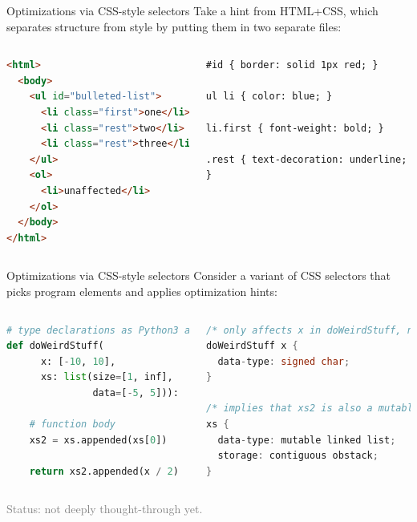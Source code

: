 \documentclass{beamer}
\begin{document}
\begin{frame}[fragile]{Optimizations via CSS-style selectors}
\vfill
Take a hint from HTML+CSS, which separates structure from style by putting them in two separate files:

\begin{columns}
\begin{lstlisting}[language=html, basicstyle=\ttfamily\scriptsize]
<html>
  <body>
    <ul id="bulleted-list">
      <li class="first">one</li>
      <li class="rest">two</li>
      <li class="rest">three</li>
    </ul>
    <ol>
      <li>unaffected</li>
    </ol>
  </body>
</html>
\end{lstlisting}

\begin{lstlisting}[basicstyle=\ttfamily\scriptsize]
#id { border: solid 1px red; }

ul li { color: blue; }

li.first { font-weight: bold; }

.rest { text-decoration: underline; }
\end{lstlisting}
\end{columns}
\end{frame}

\begin{frame}[fragile]{Optimizations via CSS-style selectors}
\vfill
Consider a variant of CSS selectors that picks program elements and applies optimization hints:

\begin{columns}
\begin{lstlisting}[language=python, basicstyle=\ttfamily\scriptsize]
# type declarations as Python3 argument decorations
def doWeirdStuff(
      x: [-10, 10],
      xs: list(size=[1, inf],
               data=[-5, 5])):

    # function body
    xs2 = xs.appended(xs[0])

    return xs2.appended(x / 2)
\end{lstlisting}

\begin{lstlisting}[language=c, basicstyle=\ttfamily\scriptsize]
/* only affects x in doWeirdStuff, not other functions */
doWeirdStuff x {
  data-type: signed char;
}

/* implies that xs2 is also a mutable linked list */
xs {
  data-type: mutable linked list;
  storage: contiguous obstack;
}
\end{lstlisting}
\end{columns}

\vfill
\hfill \textcolor{gray}{Status: not deeply thought-through yet.}
\end{frame}
\end{document}
